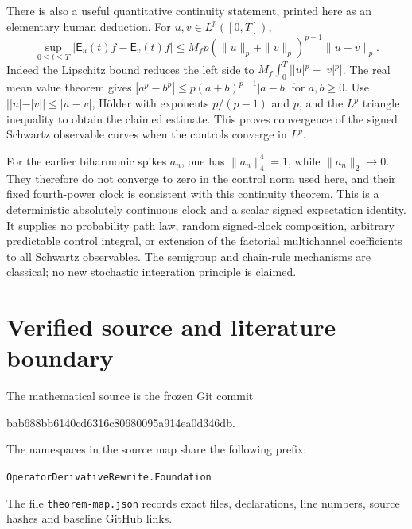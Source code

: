 \documentclass[11pt]{article}
\theoremstyle{remark}\newtheorem{remark}[theorem]{Remark}
\newcommand{\code}[1]{{\small\nolinkurl{#1}}}
\begin{document}
There is also a useful quantitative continuity statement, printed
here as an elementary human deduction. For $u,v\in L^p([0,T])$,
\[
 \sup_{0\leq t\leq T}|\mathsf E_u(t)f-\mathsf E_v(t)f|
 \leq M_fp(\|u\|_p+\|v\|_p)^{p-1}\|u-v\|_p.
\]
Indeed the Lipschitz bound reduces the left side to
$M_f\int_0^T||u|^p-|v|^p|$. The real mean value theorem gives
$|a^p-b^p|\leq p(a+b)^{p-1}|a-b|$ for $a,b\geq0$.
Use $||u|-|v||\leq|u-v|$, H\"older with exponents
$p/(p-1)$ and $p$, and the $L^p$ triangle inequality to obtain the
claimed estimate. This proves convergence of the signed Schwartz
observable curves when the controls converge in $L^p$.

For the earlier biharmonic spikes $a_n$, one has
$\|a_n\|_4^4=1$, while $\|a_n\|_2\to0$. They therefore do not
converge to zero in the control norm used here, and their fixed
fourth-power clock is consistent with this continuity theorem.
This is a deterministic absolutely continuous clock and a scalar
signed expectation identity. It supplies no probability path law,
random signed-clock composition, arbitrary predictable control
integral, or extension of the factorial multichannel coefficients
to all Schwartz observables. The semigroup and chain-rule
mechanisms are classical; no new stochastic integration principle
is claimed.

\section{Verified source and literature boundary}
The mathematical source is the frozen Git commit
\begin{center}\small\ttfamily
bab688bb6140cd6316c80680095a914ea0d346db.
\end{center}
The namespaces in the source map share the following prefix:
\begin{center}\code{OperatorDerivativeRewrite.Foundation}\end{center}

The file \code{theorem-map.json} records exact files, declarations,
line numbers, source hashes and baseline GitHub links.
\end{document}
